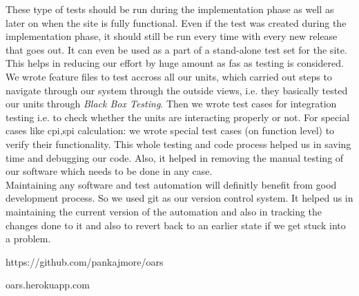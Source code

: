 \documentclass[12pt]{article}
\begin{document}
These type of tests should be run during the implementation phase as well as later on when the site is fully functional. Even if the test was created during the implementation phase, it should still be run every time with every new release that goes out. It can even be used as a part of a stand-alone test set for the site. This helps in reducing our effort by huge amount as fas as testing is considered. We wrote feature files to test accross all our units, which carried out steps to navigate through our system through the outside views, i.e. they basically tested our units through \emph{Black Box Testing}. Then we wrote test cases for integration testing i.e. to check whether the units are interacting properly or not. For special cases like cpi,spi calculation: we wrote special test cases (on function level) to verify their functionality. This whole testing and code process helped us in saving time and debugging our code. Also, it helped in removing the manual testing of our software which needs to be done in any case.\\
Maintaining any software and test automation will definitly benefit from good
development process. So we used git as our version control system. It helped
us in maintaining the current version of the automation and also in tracking
the changes done to it and also to revert back to an earlier state if we get
stuck into a problem.

\begin{thebibliography}{9}

  https://github.com/pankajmore/oars

  oars.herokuapp.com

\end{thebibliography}
\end{document}

